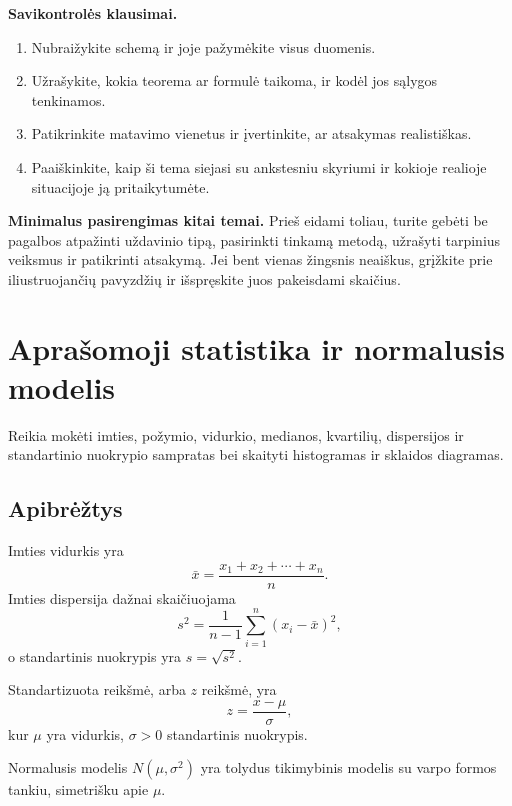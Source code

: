 \textbf{Savikontrolės klausimai.}
\begin{enumerate}[label=\arabic*.]
\item Nubraižykite schemą ir joje pažymėkite visus duomenis.
\item Užrašykite, kokia teorema ar formulė taikoma, ir kodėl jos sąlygos tenkinamos.
\item Patikrinkite matavimo vienetus ir įvertinkite, ar atsakymas realistiškas.
\item Paaiškinkite, kaip ši tema siejasi su ankstesniu skyriumi ir kokioje realioje situacijoje ją pritaikytumėte.
\end{enumerate}

\textbf{Minimalus pasirengimas kitai temai.} Prieš eidami toliau, turite gebėti be pagalbos atpažinti uždavinio tipą, pasirinkti tinkamą metodą, užrašyti tarpinius veiksmus ir patikrinti atsakymą. Jei bent vienas žingsnis neaiškus, grįžkite prie iliustruojančių pavyzdžių ir išspręskite juos pakeisdami skaičius.

\section{Aprašomoji statistika ir normalusis modelis}\label{sec:aprasomoji-statistika-ir-normalusis-modelis}

\begin{tcolorbox}[title=Prieš pradedant, colback=green!5]
Reikia mokėti imties, požymio, vidurkio, medianos, kvartilių, dispersijos ir standartinio nuokrypio sampratas bei skaityti histogramas ir sklaidos diagramas.
\end{tcolorbox}
\subsection{Apibrėžtys}

\begin{apibreztis}
Imties vidurkis yra
\[
\bar x=\frac{x_1+x_2+\cdots+x_n}{n}.
\]
Imties dispersija dažnai skaičiuojama
\[
s^2=\frac{1}{n-1}\sum_{i=1}^n(x_i-\bar x)^2,
\]
o standartinis nuokrypis yra $s=\sqrt{s^2}$.
\end{apibreztis}

\begin{apibreztis}
Standartizuota reikšmė, arba $z$ reikšmė, yra
\[
z=\frac{x-\mu}{\sigma},
\]
kur $\mu$ yra vidurkis, $\sigma>0$ standartinis nuokrypis.
\end{apibreztis}

\begin{apibreztis}
Normalusis modelis $N(\mu,\sigma^2)$ yra tolydus tikimybinis modelis su varpo formos tankiu, simetrišku apie $\mu$.
\end{apibreztis}

